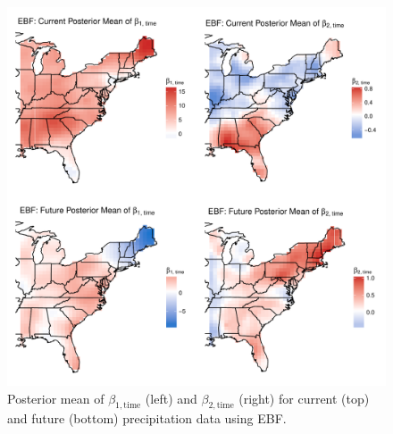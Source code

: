 \documentclass[11pt]{article}
\begin{document}
\begin{figure}[htbp]  %
  \centering
  \includegraphics[width=\linewidth]{plots/precip-ebf-post-betatime.pdf}
  \caption{Posterior mean of $\beta_{1, \text{time}}$ (left) and $\beta_{2, \text{time}}$ (right) for current (top) and future (bottom) precipitation data using EBF.}
  \label{ebfig:fire-ebfpostbeta1}
\end{figure}\tabularnewline
\end{document}
